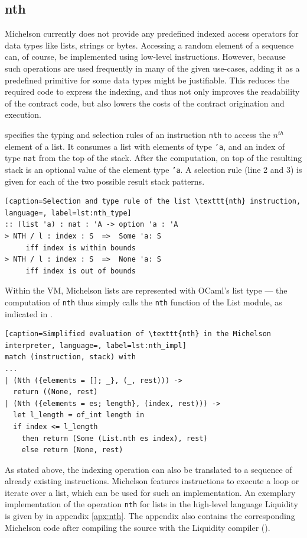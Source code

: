 \subsection{nth}\label{sec:nth}
Michelson currently does not provide any predefined indexed access operators for data types like lists, strings or bytes. Accessing a random element of a sequence can, of course, be implemented using low-level instructions. However, because such operations are used frequently in many of the given use-cases, adding it as a predefined primitive for some data types might be justifiable. This reduces the required code to express the indexing, and thus not only improves the readability of the contract code, but also lowers the costs of the contract origination and execution.

 specifies the typing and selection rules of an instruction \texttt{nth} to access the $n^{th}$ element of a list. It consumes a list with elements of type \texttt{'a}, and an index of type \texttt{nat} from the top of the stack. After the computation, on top of the resulting stack is an optional value of the element type \texttt{'a}. A selection rule (line 2 and 3) is given for each of the two possible result stack patterns.
\begin{lstlisting}[caption=Selection and type rule of the list \texttt{nth} instruction, language=, label=lst:nth_type]
:: (list 'a) : nat : 'A -> option 'a : 'A
> NTH / l : index : S  =>  Some 'a: S
     iff index is within bounds
> NTH / l : index : S  =>  None 'a: S
     iff index is out of bounds
\end{lstlisting}

Within the VM, Michelson lists are represented with OCaml's list type --- the computation of \texttt{nth} thus simply calls the \texttt{nth} function of the List module, as indicated in .
\begin{lstlisting}[caption=Simplified evaluation of \texttt{nth} in the Michelson interpreter, language=, label=lst:nth_impl]
match (instruction, stack) with
...
| (Nth ({elements = []; _}, (_, rest))) ->
  return ((None, rest)
| (Nth ({elements = es; length}, (index, rest))) ->
  let l_length = of_int length in
  if index <= l_length
    then return (Some (List.nth es index), rest)
    else return (None, rest)
\end{lstlisting}
\lstset{upquote=false}

As stated above, the indexing operation can also be translated to a sequence of already existing instructions. Michelson features instructions to execute a loop or iterate over a list, which can be used for such an implementation. An exemplary implementation of the operation \texttt{nth} for lists in the high-level language Liquidity is given by  in appendix \ref{apx:nth}. The appendix also contains the corresponding Michelson code after compiling the source with the Liquidity compiler ().

